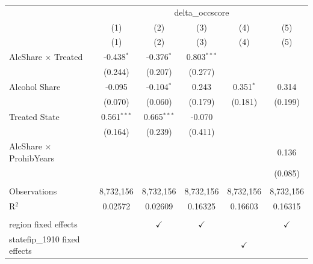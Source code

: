 
\begingroup
\centering
\begin{tabular}{lccccc}
   \toprule
    & \multicolumn{5}{c}{delta\_occscore}\\
                                  & (1)            & (2)            & (3)           & (4)           & (5) \\   
                                  & (1)            & (2)            & (3)           & (4)           & (5)\\  
   \midrule 
   AlcShare $\times$ Treated      & -0.438$^{*}$   & -0.376$^{*}$   & 0.803$^{***}$ &               &   \\
                                  & (0.244)        & (0.207)        & (0.277)       &               &   \\
   Alcohol Share                  & -0.095         & -0.104$^{*}$   & 0.243         & 0.351$^{*}$   & 0.314\\
                                  & (0.070)        & (0.060)        & (0.179)       & (0.181)       & (0.199)\\
   Treated State                  & 0.561$^{***}$  & 0.665$^{***}$  & -0.070        &               &   \\
                                  & (0.164)        & (0.239)        & (0.411)       &               &   \\
   AlcShare $\times$ ProhibYears  &                &                &               &               & 0.136\\
                                  &                &                &               &               & (0.085)\\   
    \\
   Observations                   & 8,732,156      & 8,732,156      & 8,732,156     & 8,732,156     & 8,732,156\\  
   R$^2$                          & 0.02572        & 0.02609        & 0.16325       & 0.16603       & 0.16315\\  
    \\
   region fixed effects           &                & $\checkmark$   & $\checkmark$  &               & $\checkmark$\\   
   statefip\_1910 fixed effects   &                &                &               & $\checkmark$  & \\  
   \bottomrule
\end{tabular}
 
